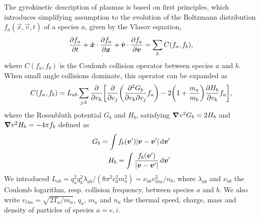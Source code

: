 The gyrokinetic description of plasmas is based on first principles, which introduces simplifying assumption to the evolution of the Boltzmann distribution $f_a(\vec{x},\vec{v},t)$ of a species $a$, given by the Vlasov equation,
\begin{equation}
	\pdv{f_a}{t} + \dot{\vec{x}}\cdot\pdv{f_a}{\vec{x}} + \dot{\vec{v}}\cdot\pdv{f_a}{\vec{v}} = \sum_b C(f_a,f_b),
	\label{eq:vlasov}
\end{equation}
where $C(f_a,f_b)$ is the Coulomb collision operator between species $a$ and $b$. When small angle collisions dominate, this operator can be expanded as
\begin{equation}
	C(f_a,f_b) = L_{ab} \sum_{j,k} \pdv{v_k} \biggl[ \pdv{v_j}\biggl(\pdv{G_b}{v_k}{v_j} f_a\biggr) - 2\biggl(1+\frac{m_a}{m_b}\biggr)\pdv{H_b}{v_k} f_a \biggr],
	\label{eq:coulomb_operator}
\end{equation}
where  the Rosenbluth potential $G_b$ and $H_b$, satisfying $\grad{v}^2G_b=2H_b$ and $\grad{v}^2H_b=-4\pi f_b$ defined as
\begin{align}
	G_b = \int f_b(\vec{v}') \abs{\vec{v}-\vec{v}'}\dd{\vec{v}'}
	\label{eq:rosenbluth_G}
	\\
	H_b = \int \frac{f_b(\vec{v}')}{\abs{\vec{v}-\vec{v}'}} \dd{\vec{v}'}
	\label{eq:rosenbluth_H}
\end{align}
We introduced $L_{ab}=q_a^2q_b^2\lambda_{ab}/(8\pi^2\epsilon_0^2m_a^2)=\nu_{ab}v_{tha}^3/n_b$, where $\lambda_{ab}$ and $\nu_{ab}$ the Coulomb logarithm, resp. collision frequency, between species $a$ and $b$. We also write $v_{tha}=\sqrt{2T_a/m_a}$, $q_a$, $m_a$ and $n_a$ the thermal speed, charge, mass and density of particles of species $a=e,i$.


